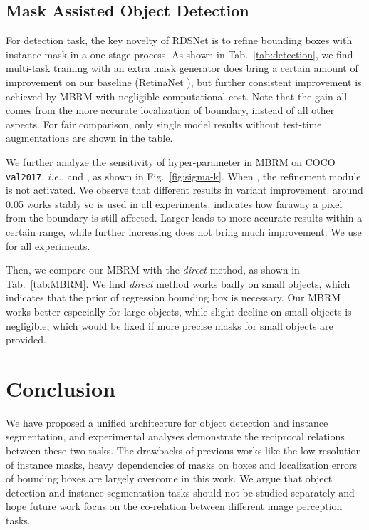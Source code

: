 \documentclass[letterpaper]{article} \usepackage{aaai20}  \usepackage{times}  \usepackage{helvet} \usepackage{courier}  \usepackage[hyphens]{url}  \usepackage{graphicx} \urlstyle{rm} \def\UrlFont{\rm}  \usepackage{graphicx}  \frenchspacing  \setlength{\pdfpagewidth}{8.5in}  \setlength{\pdfpageheight}{11in}
\begin{document}
\subsection{Mask Assisted Object Detection}
For detection task, the key novelty of RDSNet is to refine bounding boxes with instance mask in a one-stage process. As shown in Tab.~\ref{tab:detection}, we find multi-task training with an extra mask generator does bring a certain amount of improvement on our baseline (RetinaNet \cite{lin2017focal}), but further consistent improvement is achieved by MBRM with negligible computational cost. Note that the gain all comes from the more accurate localization of boundary, instead of all other aspects. For fair comparison, only single model results without test-time augmentations are shown in the table.

We further analyze the sensitivity of hyper-parameter in MBRM on COCO \texttt{val2017}, \textit{i.e.},  and , as shown in Fig.~\ref{fig:sigma-k}. When , the refinement module is not activated. We observe that different  results in variant improvement.  around 0.05 works stably so  is used in all experiments.  indicates how faraway a pixel from the boundary is still affected. Larger  leads to more accurate results within a certain range, while further increasing  does not bring much improvement. We use  for all experiments. 

Then, we compare our MBRM with the \textit{direct} method, as shown in Tab.~\ref{tab:MBRM}. We find \textit{direct} method works badly on small objects, which indicates that the prior of regression bounding box is necessary. Our MBRM works better especially for large objects, while slight decline on small objects is negligible, which would be fixed if more precise masks for small objects are provided.

\section{Conclusion}
We have proposed a unified architecture for object detection and instance segmentation, and experimental analyses demonstrate the reciprocal relations between these two tasks. The drawbacks of previous works like the low resolution of instance masks, heavy dependencies of masks on boxes and localization errors of bounding boxes are largely overcome in this work. We argue that object detection and instance segmentation tasks should not be studied separately and hope future work focus on the co-relation between different image perception tasks.

\fontsize{9.0pt}{10.0pt} \selectfont


\end{document}
